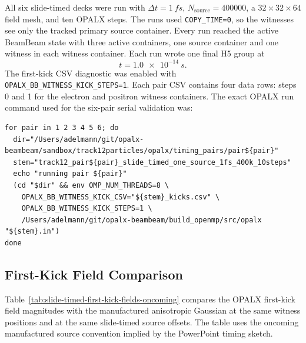\documentclass[11pt]{article}
\begin{document}
All six slide-timed decks were run with
\(\Delta t=\SI{1}{fs}\), \(N_{\mathrm{source}}=400000\), a
\(32\times 32\times 64\) field mesh, and ten OPALX steps.  The runs used
\texttt{COPY\_TIME=0}, so the witnesses see only the tracked primary source
container.  Every run reached the active BeamBeam state with three active
containers, one source container and one witness in each witness container.
Each run wrote one final H5 group at
\[
  t = \SI{1.0e-14}{s}.
\]
The first-kick CSV diagnostic was enabled with
\texttt{OPALX\_BB\_WITNESS\_KICK\_STEPS=1}.  Each pair CSV contains four data
rows: steps 0 and 1 for the electron and positron witness containers.
The exact OPALX run command used for the six-pair serial validation was:
\begin{footnotesize}
\begin{verbatim}
for pair in 1 2 3 4 5 6; do
  dir="/Users/adelmann/git/opalx-beambeam/sandbox/track12particles/opalx/timing_pairs/pair${pair}"
  stem="track12_pair${pair}_slide_timed_one_source_1fs_400k_10steps"
  echo "running pair ${pair}"
  (cd "$dir" && env OMP_NUM_THREADS=8 \
    OPALX_BB_WITNESS_KICK_CSV="${stem}_kicks.csv" \
    OPALX_BB_WITNESS_KICK_STEPS=1 \
    /Users/adelmann/git/opalx-beambeam/build_openmp/src/opalx "${stem}.in")
done
\end{verbatim}
\end{footnotesize}

\subsection{First-Kick Field Comparison}

Table~\ref{tab:slide-timed-first-kick-fields-oncoming} compares the OPALX
first-kick field magnitudes with the manufactured anisotropic Gaussian at the
same witness positions and at the same slide-timed source offsets.  The table
uses the oncoming manufactured source convention implied by the PowerPoint
timing sketch.
\end{document}
